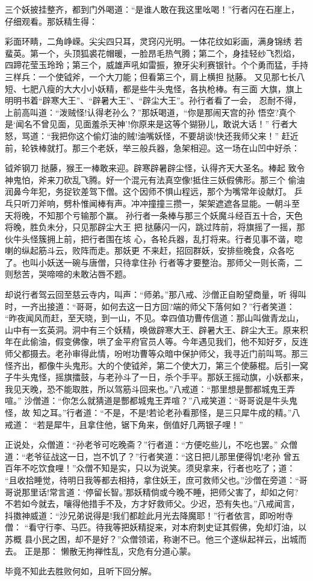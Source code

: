 三个妖披挂整齐，都到门外喝道：“是谁人敢在我这里吆喝！”行者闪在石崖上，
仔细观看。那妖精生得：

彩面环睛，二角峥嵘。尖尖四只耳，灵窍闪光明。一体花纹如彩画，满身锦绣
若蜚英。第一个，头顶狐裘花帽暖，一脸昂毛热气腾；第二个，身挂轻纱飞烈焰，
四蹄花莹玉玲玲；第三个，威雄声吼如雷振，獠牙尖利赛银针。个个勇而猛，手持
三样兵：一个使钺斧，一个大刀能；但看第三个，肩上横担挞藤。
又见那七长八短、七肥八瘦的大大小小妖精，都是些牛头鬼怪，各执枪棒。有三面
大旗，旗上明明书着“辟寒大王”、“辟暑大王”、“辟尘大王”。孙行者看了一会，
忍耐不得，上前高叫道：“泼贼怪!认得老孙么？”那妖喝道，“你是那闹天宫的孙
悟空?真个是‘闻名不曾见面，见面羞杀天神’!你原来是这等个猢狲儿，敢说大话！”
行者大怒，骂道：“我把你这个偷灯油的贼!油嘴妖怪，不要胡谈!快还我师父来！”
赶近前，轮铁棒就打。那三个老妖，举三般兵器，急架相迎。这一场在山凹中好杀：

钺斧钢刀挞藤，猴王一棒敢来迎。辟寒辟暑辟尘怪，认得齐天大圣名。棒起
致令神鬼怕，斧来刀砍乱飞腾。好一个混元有法真空像!抵住三妖假佛形。那三个
偷油润鼻今年犯，务捉钦差驾下僧。这个因师不惧山程远，那个为嘴常年设献灯。
乒乓只听刀斧响，劈朴惟闻棒有声。冲冲撞撞三攒一，架架遮遮各显能。一朝斗至
天将晚，不知那个亏输那个赢。
孙行者一条棒与那三个妖魔斗经百五十合，天色将晚，胜负未分，只见那辟尘大王
把挞藤闪一闪，跳过阵前，将旗摇了一摇，那伙牛头怪簇拥上前，把行者围在垓
心，各轮兵器，乱打将来。行者见事不谐，唿喇的纵起筋斗云，败阵而走。那妖更
不来赶，招回群妖，安排些晚食，众各吃了。也叫小妖送一碗与唐僧，只待拿住孙
行者等才要整治。那师父一则长斋，二则愁苦，哭啼啼的未敢沾唇不题。

却说行者驾云回至慈云寺内，叫声：“师弟。”那八戒、沙僧正自盼望商量，听
得叫时，一齐出接道：“哥哥，如何去这一日方回?端的师父下落何如？”行者笑道：
“昨夜闻风而赶，至天晓，到一山，不见。幸四值功曹传信道：那山叫做青龙山，
山中有一玄英洞。洞中有三个妖精，唤做辟寒大王、辟暑大王、辟尘大王。原来积
年在此偷油，假变佛像，哄了金平府官员人等。今年遇见我们，他不知好歹，反连
师父都摄去。老孙审得此情，吩咐功曹等众暗中保护师父，我寻近门前叫骂。那三
怪齐出，都像牛头鬼形。大的个使钺斧，第二个使大刀，第三个使藤棍。后引一窝
子牛头鬼怪，摇旗擂鼓，与老孙斗了一日，杀个手平。那妖王摇动旗，小妖都来，
我见天晚，恐不能取胜，所以驾筋斗回来也。”八戒道：“那里想是酆都城鬼王弄喧。”
沙僧道：“你怎么就猜道是酆都城鬼王弄喧？”八戒笑道：“哥哥说是牛头鬼怪，故
知之耳。”行者道：“不是，不是!若论老孙看那怪，是三只犀牛成的精。”八戒道：
“若是犀牛，且拿住他，锯下角来，倒值好几两银子哩！”

正说处，众僧道：“孙老爷可吃晚斋？”行者道：“方便吃些儿，不吃也罢。”
众僧道：“老爷征战这一日，岂不饥了？”行者笑道：“这日把儿那里便得饥!老孙
曾五百年不吃饮食哩！”众僧不知是实，只以为说笑。须臾拿来，行者也吃了；道：
“且收拾睡觉，待明日我等都去相持，拿住妖王，庶可救师父也。”沙僧在旁道：“哥
哥说那里话!常言道：‘停留长智。’那妖精倘或今晚不睡，把师父害了，却如之何?
不若如今就去，嚷得他措手不及，方才好救师父。少迟，恐有失也。”八戒闻言，
抖擞神威道：“沙兄弟说得是!我们都趁此月光去降魔耶！”行者依言，即吩咐寺僧：
“看守行李、马匹。待我等把妖精捉来，对本府刺史证其假佛，免却灯油，以苏概
县小民之困，却不是好？”众僧领诺，称谢不已。他三个遂纵起祥云，出城而去。
正是那：
懒散无拘禅性乱，灾危有分道心蒙。

毕竟不知此去胜败何如，且听下回分解。